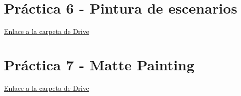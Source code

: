 \documentclass[12pt]{article}
\begin{document}
\section{Práctica 6 - Pintura de escenarios}
    \href{https://drive.google.com/open?id=114vjTeTyRJybFyeHqkXezYsqg_CLAedU&usp=drive_fs}{Enlace a la carpeta de Drive}
\section{Práctica 7 - Matte Painting}
    \href{https://drive.google.com/open?id=112WAWWTA2i6QlavAoZR_mXhKWVeSXaxM&usp=drive_fs}{Enlace a la carpeta de Drive}
\end{document}
